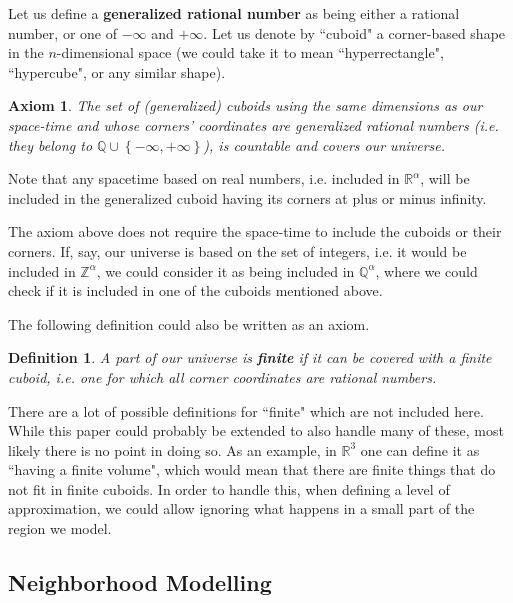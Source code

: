 \documentclass[a4paper
,draft
]{article}
\def\reale{\mathbb{R}}
\def\intregi{\mathbb{Z}}
\def\rationale{\mathbb{Q}}
\newcommand{\multime}[1]{\left\{ #1 \right\}}
\newcommand{\definitie}[1]{\textbf{#1}}
\newcommand{\ghilimele}[1]{``#1"}
\newtheorem{definition}{Definition}
\newtheorem{axiom}{Axiom}
\begin{document}
Let us define a \definitie{generalized rational number} as being either a
rational number, or one of $-\infty$ and $+\infty$. Let us denote by
\ghilimele{cuboid} a corner-based shape in the $n$-dimensional space
(we could take it to mean \ghilimele{hyperrectangle}, \ghilimele{hypercube},
or any similar shape).

\begin{axiom}\label{ax:rationalcovering}
  The set of (generalized) cuboids using the same dimensions as our space-time
  and whose corners' coordinates are generalized rational numbers (i.e. they
  belong to $\rationale\cup\multime{-\infty, +\infty}$),
  is countable and covers our universe.
\end{axiom}

Note that any spacetime based on real numbers, i.e. included
in $\reale^\alpha$, will be included in the generalized cuboid having
its corners at plus or minus infinity.

The axiom above does not require the space-time to include the cuboids or
their corners.
If, say, our universe is based on the set of integers, i.e.
it would be included in $\intregi^\alpha$,
we could consider it as being included in $\rationale^\alpha$,
where we could check if it is included in one of the cuboids mentioned
above.

The following definition could also be written as an axiom.

\begin{definition}\label{finitecuboid}
  A part of our universe is \definitie{finite} if
  it can be covered with a finite cuboid, i.e. one
  for which all corner coordinates are rational numbers.
\end{definition}

There are a lot of possible definitions for \ghilimele{finite} which are not
included here.
While this paper could probably be extended to also handle many of these,
most likely there is no point in doing so.
As an example, in $\reale^3$ one can define it as
\ghilimele{having a finite volume}, which would
mean that there are finite things that do not fit in finite cuboids.
In order to handle this, when defining a level of approximation,
we could allow ignoring what happens in a small part of the region we model.

\subsection{Neighborhood Modelling}
\end{document}
